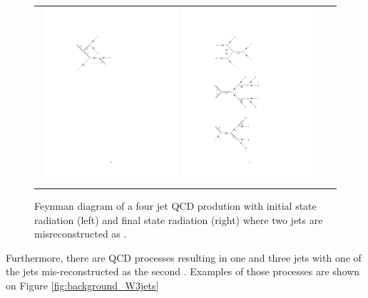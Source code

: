 \begin{figure}[tbh!]
	\centering
	\begin{tabular}{cc}
		\includegraphics[width=0.48\textwidth]{diagrams/pics/background_QCDinitrad.pdf}
		\includegraphics[width=0.48\textwidth]{diagrams/pics/background_QCDfinrad.pdf}
	\end{tabular}
	\caption{Feynman diagram of a four jet QCD prodution with initial state radiation (left) and final state radiation (right) where two jets are misreconstructed as \hadtau. }
	\label{fig:background_QCDinitrad}
\end{figure}

Furthermore, there are QCD processes resulting in one \hadtau and three jets with one of the jets mis-reconstructed as the second \hadtau. Examples of those processes are shown on Figure \ref{fig:background_W3jets}

